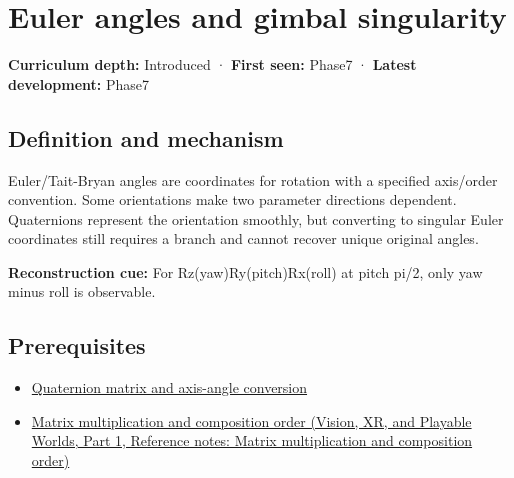 \hypertarget{appendix-5f723fbd0593}{}\label{referencestart:appendix-5f723fbd0593}
\section{Euler angles and gimbal singularity}\label{appendix-5f723fbd0593-euler-angles-and-gimbal-singularity}

\hypertarget{appendix-5f723fbd0593-euler-angles-and-gimbal-singularity}{}

\textbf{Curriculum depth:} Introduced · \textbf{First seen:} Phase7 · \textbf{Latest development:} Phase7

\begin{allmightroledefinition}

\subsection{Definition and mechanism}\label{appendix-5f723fbd0593-definition-and-mechanism}

\hypertarget{appendix-5f723fbd0593-definition-and-mechanism}{}

Euler/Tait-Bryan angles are coordinates for rotation with a specified axis/order convention. Some orientations make two parameter directions dependent. Quaternions represent the orientation smoothly, but converting to singular Euler coordinates still requires a branch and cannot recover unique original angles.

\end{allmightroledefinition}

\textbf{Reconstruction cue:} For Rz(yaw)Ry(pitch)Rx(roll) at pitch pi/2, only yaw minus roll is observable.

\subsection{Prerequisites}\label{appendix-5f723fbd0593-prerequisites}

\hypertarget{appendix-5f723fbd0593-prerequisites}{}

\begin{itemize}
\tightlist
\item
  \hyperref[appendix-26d8da71f6c4]{Quaternion matrix and axis-angle conversion}
\item
  \href{../07-Vision-XR-and-Playable-Worlds-P01/main.pdf\#nameddest=appendix-ab31ef447dbf}{Matrix multiplication and composition order (Vision, XR, and Playable Worlds, Part 1, Reference notes: Matrix multiplication and composition order)}
\end{itemize}


